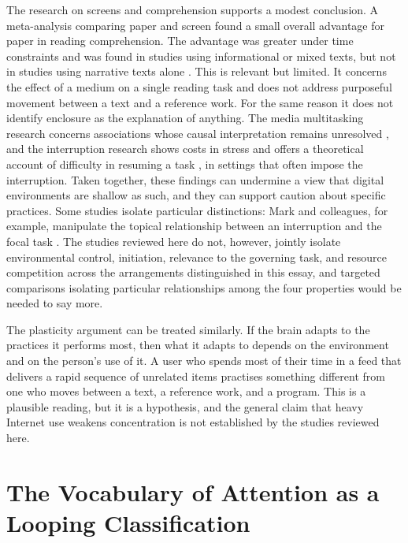 \documentclass[12pt]{article}
\begin{document}
The research on screens and comprehension supports a modest conclusion. A meta-analysis comparing paper and screen found a small overall advantage for paper in reading comprehension. The advantage was greater under time constraints and was found in studies using informational or mixed texts, but not in studies using narrative texts alone \cite{delgado2018dont}. This is relevant but limited. It concerns the effect of a medium on a single reading task and does not address purposeful movement between a text and a reference work. For the same reason it does not identify enclosure as the explanation of anything. The media multitasking research concerns associations whose causal interpretation remains unresolved \cite{uncapher2018minds}, and the interruption research shows costs in stress \cite{mark2008cost} and offers a theoretical account of difficulty in resuming a task \cite{altmann2002memory}, in settings that often impose the interruption. Taken together, these findings can undermine a view that digital environments are shallow as such, and they can support caution about specific practices. Some studies isolate particular distinctions: Mark and colleagues, for example, manipulate the topical relationship between an interruption and the focal task \cite{mark2008cost}. The studies reviewed here do not, however, jointly isolate environmental control, initiation, relevance to the governing task, and resource competition across the arrangements distinguished in this essay, and targeted comparisons isolating particular relationships among the four properties would be needed to say more.

The plasticity argument can be treated similarly. If the brain adapts to the practices it performs most, then what it adapts to depends on the environment and on the person's use of it. A user who spends most of their time in a feed that delivers a rapid sequence of unrelated items practises something different from one who moves between a text, a reference work, and a program. This is a plausible reading, but it is a hypothesis, and the general claim that heavy Internet use weakens concentration is not established by the studies reviewed here.

\section{The Vocabulary of Attention as a Looping Classification}
\end{document}
